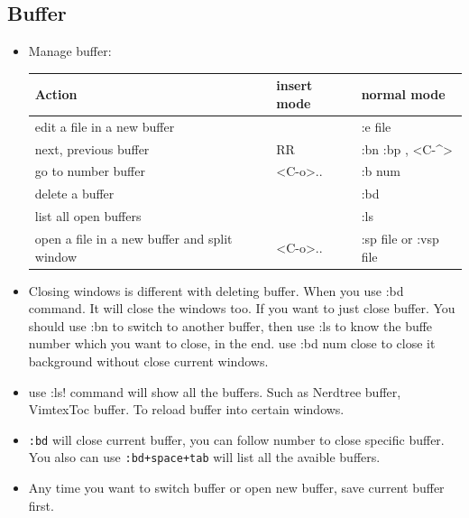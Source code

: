 \documentclass[a4paper,12pt,twoside]{book}
\begin{document}
\subsection{Buffer}
\begin{itemize}
		\item Manage buffer:
\begin{center}
\begin{tabular}{p{}|p{}|p{}}
		   \hline
		Action & insert mode & normal mode \\
		
		\hline 
		edit a file in a new buffer & &  :e file\\
				
		\hline 
		next, previous buffer & RR &  :bn :bp , <C-\^{}> \\
		
        \hline 
		go to number buffer &<C-o>.. &  :b num \\		
		
		\hline 
		delete a buffer & & :bd \\
		
		\hline 
		list all open buffers & & :ls\\
		
		\hline
		open a file in a new buffer and split window
	 & <C-o>..& :sp file or :vsp file \\
	\hline 	
			\end{tabular}
	\end{center}

			\item Closing windows is different with deleting buffer. When you use :bd command. It will close the windows too. If you want to just close buffer. You should use :bn to switch to another buffer, then use :ls to know the buffe number which you want to close, in the end. use :bd num close to close it background without close current windows.

		\item use :ls! command will show all the buffers. Such as Nerdtree buffer, VimtexToc buffer. To reload buffer into certain windows. 

			\item \texttt{:bd} will close current buffer, you can follow number to close specific buffer. You also can use \texttt{:bd+space+tab} will list all the avaible buffers.

			\item Any time you want to switch buffer or open new buffer, save current buffer first.
			

\end{itemize}
\end{document}
